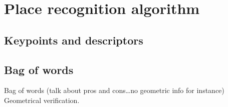 \section{Place recognition algorithm}
\label{sec:chap_slam_algo}

\subsection{Keypoints and descriptors}
\label{ssec:chap_slam_features}

\subsection{Bag of words}
\label{ssec:chap_slam_features}

Bag of words (talk about pros and cons\dots no geometric info for instance)
Geometrical verification.
